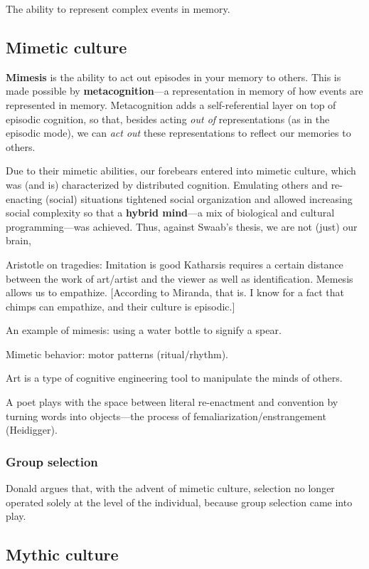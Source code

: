 \documentclass{article}
\begin{document}
The ability to represent complex events in memory.

\subsection{Mimetic culture}

\textbf{Mimesis} is the ability to act out episodes in your memory to others. 
This is made possible by \textbf{metacognition}---a representation in memory of
how events are represented in memory. Metacognition adds a self-referential
layer on top of episodic cognition, so that, besides acting \emph{out of}
representations (as in the episodic mode), we can \emph{act out} these
representations to reflect our memories to others.

Due to their mimetic abilities, our forebears entered into mimetic culture,
which was (and is) characterized by distributed cognition. Emulating others
and re-enacting (social) situations tightened social organization and allowed
increasing social complexity so that a \textbf{hybrid mind}---a mix of
biological and cultural programming---was achieved. Thus, against Swaab's thesis,
we are not (just) our brain, 

Aristotle on tragedies: Imitation is good
Katharsis requires a certain distance between the work of art/artist and the viewer as well as identification. Memesis allows us to empathize. [According to Miranda, that is. I know for a fact that chimps can empathize, and their culture is episodic.]

An example of mimesis: using a water bottle to signify a spear.

Mimetic behavior: motor patterns (ritual/rhythm).

Art is a type of cognitive engineering tool to manipulate the minds of others.

A poet plays with the space between literal re-enactment and convention by turning words into objects---the process of femaliarization/enstrangement (Heidigger).

\subsubsection{Group selection}

Donald argues that, with the advent of mimetic culture, selection no longer operated solely at the level of the individual, because group selection came into play.

\subsection{Mythic culture}
\end{document}
